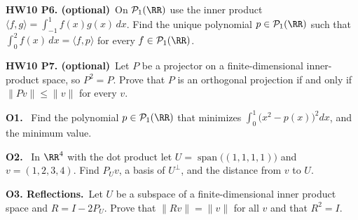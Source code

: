\documentclass[10pt]{scrartcl}
\DeclareMathOperator{\spn}{span}
\newcommand{\PP}{\mathcal P}
\newcommand{\ip}[2]{\langle #1,#2\rangle}
\newenvironment{prob}{\par\bigskip\noindent\begin{minipage}{\linewidth}\setlength{\parskip}{4pt}}{\end{minipage}\par}
\begin{document}
\begin{prob}
\textbf{HW10 P6. (optional)}\ On $\PP_1(\RR)$ use the inner product $\ip fg=\int_{-1}^1f(x)g(x)\,dx$. Find the unique polynomial $p\in\PP_1(\RR)$ such that $\int_0^2f(x)\,dx=\ip fp$ for every $f\in\PP_1(\RR)$.
\end{prob}

\begin{prob}
\textbf{HW10 P7. (optional)}\ Let $P$ be a projector on a finite-dimensional inner-product space, so $P^2=P$. Prove that $P$ is an orthogonal projection if and only if $\|Pv\|\le\|v\|$ for every $v$.
\end{prob}

\begin{prob}
\textbf{O1. }\ Find the polynomial $p\in\PP_1(\RR)$ that minimizes $\int_0^1\big(x^2-p(x)\big)^2dx$, and the minimum value.
\end{prob}

\begin{prob}
\textbf{O2. }\ In $\RR^4$ with the dot product let $U=\spn\big((1,1,1,1)\big)$ and $v=(1,2,3,4)$. Find $P_Uv$, a basis of $U^\perp$, and the distance from $v$ to $U$.
\end{prob}

\begin{prob}
\textbf{O3. Reflections.}\ Let $U$ be a subspace of a finite-dimensional inner product space and $R=I-2P_U$. Prove that $\|Rv\|=\|v\|$ for all $v$ and that $R^2=I$.
\end{prob}
\end{document}
